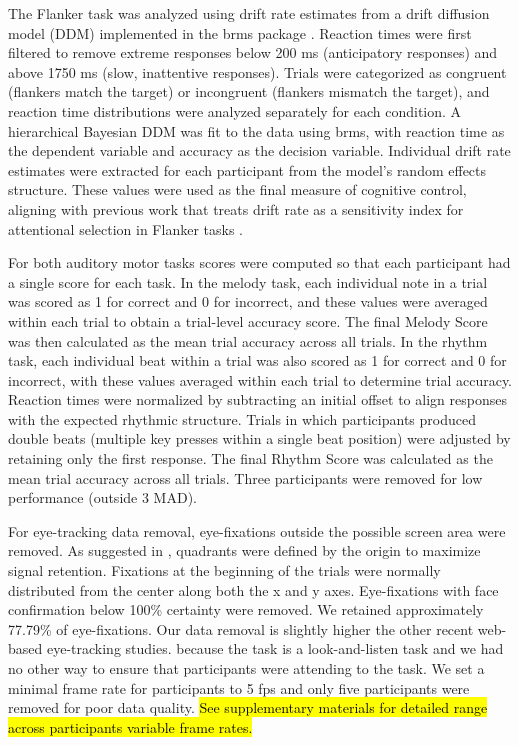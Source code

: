 The Flanker task was analyzed using drift rate estimates from a drift diffusion model (DDM) implemented in the brms package \parencite{burkner2017brms}. Reaction times were first filtered to remove extreme responses below 200 ms (anticipatory responses) and above 1750 ms (slow, inattentive responses). Trials were categorized as congruent (flankers match the target) or incongruent (flankers mismatch the target), and reaction time distributions were analyzed separately for each condition. A hierarchical Bayesian DDM was fit to the data using brms, with reaction time as the dependent variable and accuracy as the decision variable. Individual drift rate estimates were extracted for each participant from the model’s random effects structure. These values were used as the final measure of cognitive control, aligning with previous work that treats drift rate as a sensitivity index for attentional selection in Flanker tasks \parencite{poole2024putting}. 

For both auditory motor tasks scores were computed so that each participant had a single score for each task. In the melody task, each individual note in a trial was scored as 1 for correct and 0 for incorrect, and these values were averaged within each trial to obtain a trial-level accuracy score. The final Melody Score was then calculated as the mean trial accuracy across all trials.  In the rhythm task, each individual beat within a trial was also scored as 1 for correct and 0 for incorrect, with these values averaged within each trial to determine trial accuracy. Reaction times were normalized by subtracting an initial offset to align responses with the expected rhythmic structure. Trials in which participants produced double beats (multiple key presses within a single beat position) were adjusted by retaining only the first response. The final Rhythm Score was calculated as the mean trial accuracy across all trials. Three participants were removed for low performance (outside 3 MAD).

For eye-tracking data removal, eye-fixations outside the possible screen area were removed. As suggested in \cite{AOW}, quadrants were defined by the origin to maximize signal retention. Fixations at the beginning of the trials were normally distributed from the center along both the x and y axes. Eye-fixations with face confirmation below 100\% certainty were removed. We retained approximately 77.79\% of eye-fixations. Our data removal is slightly higher the other recent web-based eye-tracking studies. because the task is a look-and-listen task and we had no other way to ensure that participants were attending to the task. We set a minimal frame rate for participants to 5 fps \parencite{Vos_2022} and only five participants were removed for poor data quality. \hl{See supplementary materials for detailed range across participants variable frame rates.}

